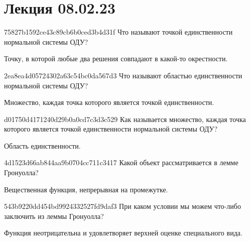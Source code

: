 


\section{Лекция 08.02.23}
\begin{note}{75827b1592ce43c89cb6b0ced3b4d31f}
    Что называют точкой единственности нормальной системы ОДУ?

    \begin{cloze}{1}
        Точку, в которой любые два решения совпадают в какой-то окрестности.
    \end{cloze}
\end{note}

\begin{note}{2ea8ea4d05724302a63c54bc0da567d3}
    Что называют областью единственности нормальной системы ОДУ?

    \begin{cloze}{1}
        Множество, каждая точка которого является точкой единственности.
    \end{cloze}
\end{note}

\begin{note}{d01750d4171240d29b0a0cd7c3d3c529}
    Как называется множество, каждая точка которого является точкой единственности нормальной системы ОДУ?

    \begin{cloze}{1}
        Область единственности.
    \end{cloze}
\end{note}

\begin{note}{4d1523d66ab844aa9b0704cc711c3417}
    Какой объект рассматривается в лемме Гронуолла?

    \begin{cloze}{1}
        Вещественная функция, непрерывная на промежутке.
    \end{cloze}
\end{note}

\begin{note}{543b9220dd454bd9924332527fd9daf3}
    При каком условии мы можем что-либо заключить из леммы Гронуолла?

    \begin{cloze}{1}
        Функция неотрицательна и удовлетворяет верхней оценке специального вида.
    \end{cloze}
\end{note}

